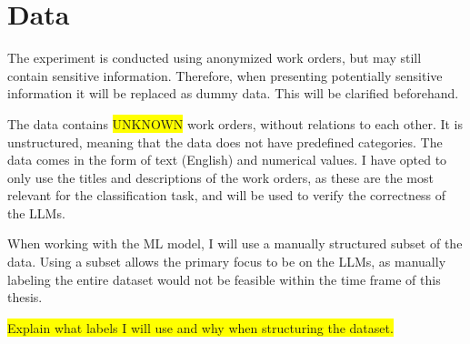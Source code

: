 \section{Data}

The experiment is conducted using anonymized work orders, but may still contain
sensitive information.
Therefore, when presenting potentially sensitive information it will be replaced
as dummy data.
This will be clarified beforehand.

The data contains \colorbox{yellow}{UNKNOWN} work orders, without relations
to each other.
It is unstructured, meaning that the data does not have predefined categories.
The data comes in the form of text (English) and numerical values.
I have opted to only use the titles and descriptions of the work orders,
as these are the most relevant for the classification task, and will be used to
verify the correctness of the LLMs.

When working with the ML model, I will use a manually structured subset of the
data.
Using a subset allows the primary focus to be on the LLMs, as manually labeling
the entire dataset would not be feasible within the time frame of this thesis.

\colorbox{yellow}{Explain what labels I will use and why when structuring the
    dataset.}



